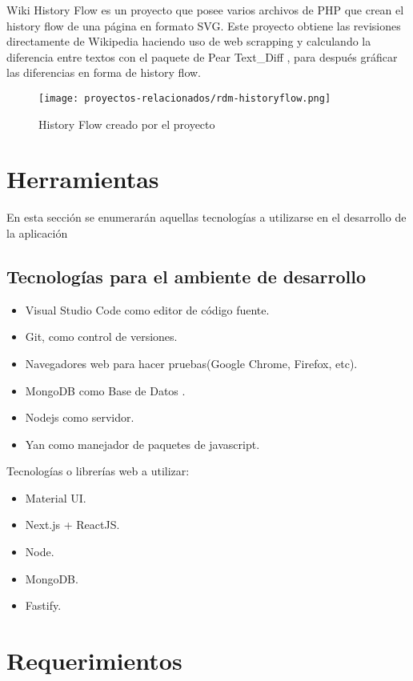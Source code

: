Wiki History Flow es un proyecto que posee varios archivos de PHP que crean el history flow de una página en formato SVG. Este proyecto obtiene las revisiones directamente de Wikipedia haciendo uso de web scrapping y calculando la diferencia entre textos con el paquete de Pear Text\_Diff \cite{pear_text_diff}, para después gráficar las diferencias en forma de history flow.

\begin{figure}[H]
    \centering
    \texttt{[image: proyectos-relacionados/rdm-historyflow.png]}
    \caption{History Flow creado por el proyecto}
    \label{fig:rdm-historyflow}
\end{figure}


\section{Herramientas}
En esta sección se enumerarán aquellas tecnologías a utilizarse en el desarrollo de la aplicación 

\subsection{Tecnologías para el ambiente de desarrollo}
\begin{itemize}
    \item Visual Studio Code como editor de código fuente.
    \item Git, como control de versiones.
    \item Navegadores web para hacer pruebas(Google Chrome, Firefox, etc).
    \item MongoDB como Base de Datos .
    \item Nodejs como servidor.
    \item Yan como manejador de paquetes de javascript.
\end{itemize}

Tecnologías o librerías web a utilizar:
\begin{itemize}
    \item Material UI.
    \item Next.js + ReactJS.
    \item Node.
    \item MongoDB.
    \item Fastify.
\end{itemize}

\section{Requerimientos}

